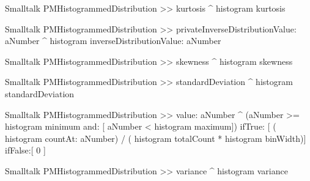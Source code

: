 \begin{displaycode}{Smalltalk}
PMHistogrammedDistribution >> kurtosis
    ^ histogram kurtosis
\end{displaycode}

\begin{displaycode}{Smalltalk}
PMHistogrammedDistribution >> privateInverseDistributionValue: aNumber
    ^ histogram inverseDistributionValue: aNumber
\end{displaycode}

\begin{displaycode}{Smalltalk}
PMHistogrammedDistribution >> skewness
    ^ histogram skewness
\end{displaycode}

\begin{displaycode}{Smalltalk}
PMHistogrammedDistribution >> standardDeviation
    ^ histogram standardDeviation
\end{displaycode}

\begin{displaycode}{Smalltalk}
PMHistogrammedDistribution >> value: aNumber
    ^ (aNumber >= histogram minimum and: [ aNumber < histogram 
                                                             maximum])
        ifTrue: [ ( histogram countAt: aNumber) / ( histogram 
                                     totalCount * histogram binWidth)]
        ifFalse:[ 0 ]
\end{displaycode}

\begin{displaycode}{Smalltalk}
PMHistogrammedDistribution >> variance
    ^ histogram variance
\end{displaycode}

